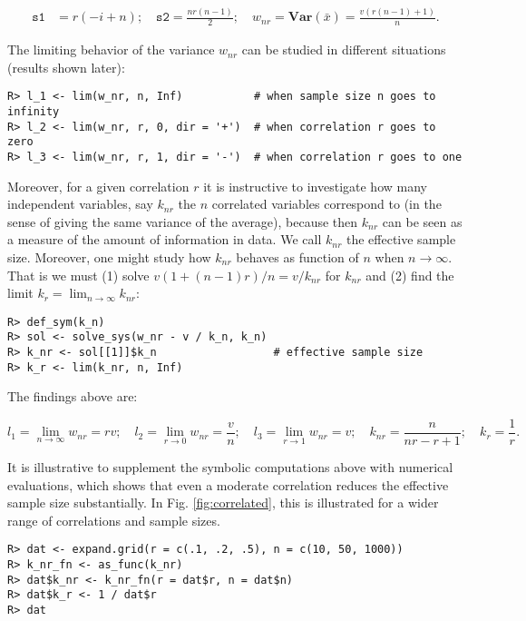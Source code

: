 \begin{align}
\texttt{s1} &= r \left(- i + n\right); \quad
\texttt{s2} = \frac{n r \left(n - 1\right)}{2}; \quad 
w_{nr} = \mathbf{Var}(\bar x)= \frac{v \left(r \left(n - 1\right) + 1\right)}{n}.
\end{align}

The limiting behavior of the variance
\(w_{nr}\) can be studied in different situations (results shown later):

\begin{verbatim}
R> l_1 <- lim(w_nr, n, Inf)           # when sample size n goes to infinity
R> l_2 <- lim(w_nr, r, 0, dir = '+')  # when correlation r goes to zero
R> l_3 <- lim(w_nr, r, 1, dir = '-')  # when correlation r goes to one
\end{verbatim}

Moreover, for a given correlation
\(r\) it is instructive to investigate how many independent variables,
say \(k_{nr}\) the \(n\) correlated variables correspond to (in the sense of
giving the same variance of the average), because then \(k_{nr}\) can be seen as a
measure of the amount of information in data. We call \(k_{nr}\) the
effective sample size. Moreover, one might study how \(k_{nr}\) behaves
as function of \(n\) when \(n \rightarrow \infty\). That is we must (1)
solve \(v (1 + (n-1)r)/n = v/k_{nr}\) for \(k_{nr}\) and (2) find the limit \(k_r = \lim_{n\rightarrow\infty} k_{nr}\):

\begin{verbatim}
R> def_sym(k_n)
R> sol <- solve_sys(w_nr - v / k_n, k_n)
R> k_nr <- sol[[1]]$k_n                  # effective sample size
R> k_r <- lim(k_nr, n, Inf)
\end{verbatim}

The findings above are:

\begin{equation}
l_1 = \lim_{n\rightarrow\infty} w_{nr} = r v; \quad
l_2 = \lim_{r\rightarrow 0} w_{nr} = \frac{v}{n}; \quad
l_3 = \lim_{r\rightarrow 1} w_{nr} = v; \quad
k_{nr} = \frac{n}{n r - r + 1}; \quad 
k_r = \frac{1}{r} .
\end{equation}

It is illustrative to supplement the symbolic computations above with
numerical evaluations, which shows that even a moderate correlation
reduces the effective sample size substantially. In
Fig. \ref{fig:correlated}, this is illustrated for a wider range of
correlations and sample sizes.

\begin{verbatim}
R> dat <- expand.grid(r = c(.1, .2, .5), n = c(10, 50, 1000))
R> k_nr_fn <- as_func(k_nr)
R> dat$k_nr <- k_nr_fn(r = dat$r, n = dat$n)
R> dat$k_r <- 1 / dat$r
R> dat
\end{verbatim}

